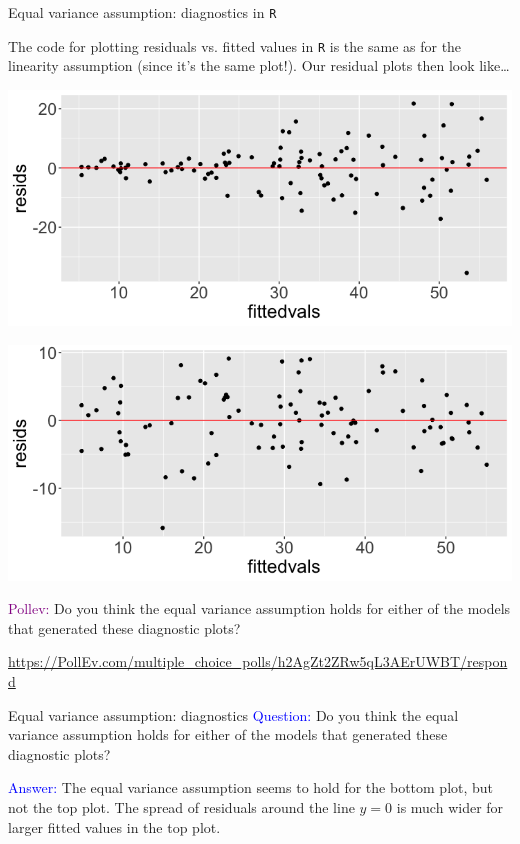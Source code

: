 \documentclass[10pt,t]{beamer}
\begin{document}
\begin{frame}{Equal variance assumption: diagnostics in \texttt{R}}
	\vspace{-5 mm}
	
The code for plotting residuals vs. fitted values in \texttt{R} is the same as for the linearity assumption (since it's the same plot!). Our residual plots then look like\dots

\centering

\includegraphics[scale=0.2]{figures/eqvar_resids1.png}

\includegraphics[scale=0.2]{figures/eqvar_resids2.png} \pause

\textcolor{purple}{Pollev:} Do you think the equal variance assumption holds for either of the models that generated these diagnostic plots?
\smallskip

\footnotesize{\url{https://PollEv.com/multiple_choice_polls/h2AgZt2ZRw5qL3AErUWBT/respond}}

\end{frame}



\begin{frame}{Equal variance assumption: diagnostics}
\textcolor{blue}{Question:} Do you think the equal variance assumption holds for either of the models that generated these diagnostic plots?

\vspace{0.3cm}

\textcolor{blue}{Answer:} The equal variance assumption seems to hold for the bottom plot, but not the top plot. The spread of residuals around the line $y = 0$ is much wider for larger fitted values in the top plot. 
\end{frame}
\end{document}
